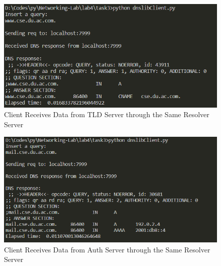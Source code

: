 \documentclass[11pt]{article}
\begin{document}
        \begin{figure}[!h]
            \centering
            \includegraphics*[width=\textwidth]{task3_client_back_from_tld.png}
            \caption{Client Receives Data from TLD Server through the Same Resolver Server}
        \end{figure}
        \FloatBarrier
        
        \begin{figure}[!h]
            \centering
            \includegraphics*[width=\textwidth]{task3_client_back_from_auth.png}
            \caption{Client Receives Data from Auth Server through the Same Resolver Server}
        \end{figure}
        \FloatBarrier
\end{document}
